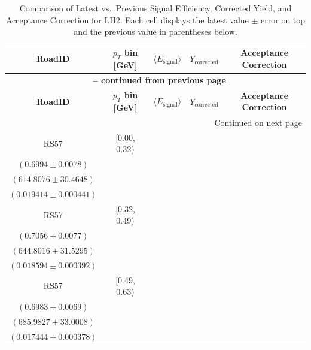 {\footnotesize
\renewcommand{\arraystretch}{1.35}
\begin{longtable}{|c|c|c|c|c|}
\caption{Comparison of Latest vs.\ Previous Signal Efficiency, Corrected Yield, and Acceptance Correction for LH2. Each cell displays the latest value $\pm$ error on top and the previous value in parentheses below.} \label{tab:eff_acc_comp_LH2} \\
\hline
\textbf{RoadID} & \textbf{$p_{T}$ bin [GeV]} & \textbf{$\langle E_{\mathrm{signal}} \rangle$} & \textbf{$Y_{\mathrm{corrected}}$} & \textbf{Acceptance Correction} \\
\hline
\endfirsthead
\multicolumn{5}{c}{{\bfseries \tablename\ \thetable{} -- continued from previous page}} \\
\hline
\textbf{RoadID} & \textbf{$p_{T}$ bin [GeV]} & \textbf{$\langle E_{\mathrm{signal}} \rangle$} & \textbf{$Y_{\mathrm{corrected}}$} & \textbf{Acceptance Correction} \\
\hline
\endhead
\hline \multicolumn{5}{|r|}{{Continued on next page}} \\ \hline
\endfoot
\hline
\endlastfoot
RS57 & [0.00, 0.32) & \begin{tabular}{@{}c@{}}$0.7254 \pm 0.0078$ \\ $(0.6994 \pm 0.0078)$\end{tabular} & \begin{tabular}{@{}c@{}}$592.7504 \pm 29.3719$ \\ $(614.8076 \pm 30.4648)$\end{tabular} & \begin{tabular}{@{}c@{}}$0.017079 \pm 0.000772$ \\ $(0.019414 \pm 0.000441)$\end{tabular} \\ \hline
RS57 & [0.32, 0.49) & \begin{tabular}{@{}c@{}}$0.7226 \pm 0.0081$ \\ $(0.7056 \pm 0.0077)$\end{tabular} & \begin{tabular}{@{}c@{}}$629.6391 \pm 30.7881$ \\ $(644.8016 \pm 31.5295)$\end{tabular} & \begin{tabular}{@{}c@{}}$0.015731 \pm 0.000676$ \\ $(0.018594 \pm 0.000392)$\end{tabular} \\ \hline
RS57 & [0.49, 0.63) & \begin{tabular}{@{}c@{}}$0.7056 \pm 0.0084$ \\ $(0.6983 \pm 0.0069)$\end{tabular} & \begin{tabular}{@{}c@{}}$678.8519 \pm 32.6578$ \\ $(685.9827 \pm 33.0008)$\end{tabular} & \begin{tabular}{@{}c@{}}$0.015673 \pm 0.000671$ \\ $(0.017444 \pm 0.000378)$\end{tabular} \\ \hline

\end{longtable}}
